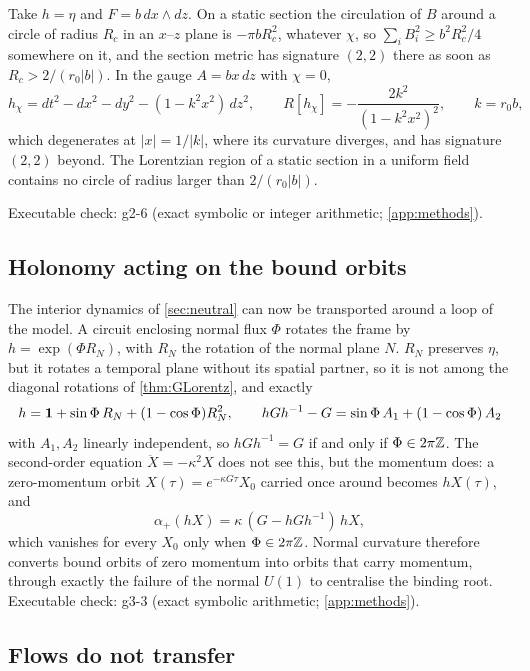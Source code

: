 \begin{example}
\label{ex:landau}
Take $h=\eta$ and $F=b\,dx\wedge dz$. On a static section the circulation of $B$ around a circle of radius $R_c$ in an $x$--$z$ plane is $-\pi bR_c^2$, whatever $\chi$,
so $\sum_iB_i^2\ge b^2R_c^2/4$ somewhere on it, and the section metric has signature $(2,2)$ there as soon as $R_c>2/(r_0|b|)$. In the gauge $A=bx\,dz$ with $\chi=0$,
\[
h_\chi=dt^2-dx^2-dy^2-(1-k^2x^2)\,dz^2,\qquad R[h_\chi]=-\frac{2k^2}{(1-k^2x^2)^2},\qquad k=r_0b,
\]
which degenerates at $|x|=1/|k|$, where its curvature diverges, and has signature $(2,2)$ beyond. The Lorentzian region of a static section in a uniform field
contains no circle of radius larger than $2/(r_0|b|)$.
\end{example}

\noindent Executable check: g2-6 (exact symbolic or integer arithmetic; \cref{app:methods}).

\subsection{Holonomy acting on the bound orbits}

The interior dynamics of \cref{sec:neutral} can now be transported around a loop of the model. A circuit enclosing normal flux $\Phi$ rotates the frame by
$h=\exp(\Phi R_N)$, with $R_N$ the rotation of the normal plane $N$. $R_N$ preserves $\eta$, but it rotates a temporal plane without its spatial partner, so it is not
among the diagonal rotations of \cref{thm:GLorentz}, and exactly
\[
h=\mathbf 1+\sin\Phi\,R_N+(1-\cos\Phi)R_N^2,\qquad hGh^{-1}-G=\sin\Phi\,A_1+(1-\cos\Phi)\,A_2
\]
with $A_1,A_2$ linearly independent, so $hGh^{-1}=G$ if and only if $\Phi\in2\pi\mathbb{Z}$. The second-order equation $\ddot X=-\kappa^2X$ does not see this, but the momentum
does: a zero-momentum orbit $X(\tau)=e^{-\kappa G\tau}X_0$ carried once around becomes $hX(\tau)$, and
\[
\alpha_+(hX)=\kappa\,(G-hGh^{-1})\,hX ,
\]
which vanishes for every $X_0$ only when $\Phi\in2\pi\mathbb{Z}$. Normal curvature therefore converts bound orbits of zero momentum into orbits that carry momentum, through
exactly the failure of the normal $U(1)$ to centralise the binding root. Executable check: g3-3 (exact symbolic arithmetic; \cref{app:methods}).

\subsection{Flows do not transfer}

